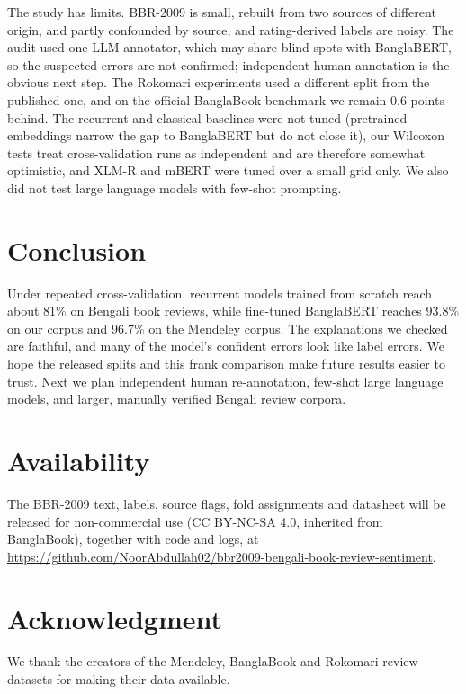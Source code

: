 \documentclass[conference,a4paper]{IEEEtran}
\begin{document}
The study has limits. BBR-2009 is small, rebuilt from two sources of different origin, and partly confounded by source, and rating-derived labels are noisy. The audit used one LLM annotator, which may share blind spots with BanglaBERT, so the suspected errors are not confirmed; independent human annotation is the obvious next step. The Rokomari experiments used a different split from the published one, and on the official BanglaBook benchmark we remain 0.6 points behind. The recurrent and classical baselines were not tuned (pretrained embeddings narrow the gap to BanglaBERT but do not close it), our Wilcoxon tests treat cross-validation runs as independent and are therefore somewhat optimistic, and XLM-R and mBERT were tuned over a small grid only. We also did not test large language models with few-shot prompting.

\section{Conclusion}
Under repeated cross-validation, recurrent models trained from scratch reach about 81\% on Bengali book reviews, while fine-tuned BanglaBERT reaches 93.8\% on our corpus and 96.7\% on the Mendeley corpus. The explanations we checked are faithful, and many of the model's confident errors look like label errors. We hope the released splits and this frank comparison make future results easier to trust. Next we plan independent human re-annotation, few-shot large language models, and larger, manually verified Bengali review corpora.

\section*{Availability}
The BBR-2009 text, labels, source flags, fold assignments and datasheet will be released for non-commercial use (CC BY-NC-SA 4.0, inherited from BanglaBook), together with code and logs, at \url{https://github.com/NoorAbdullah02/bbr2009-bengali-book-review-sentiment}.

\section*{Acknowledgment}
We thank the creators of the Mendeley, BanglaBook and Rokomari review datasets for making their data available.



\end{document}
